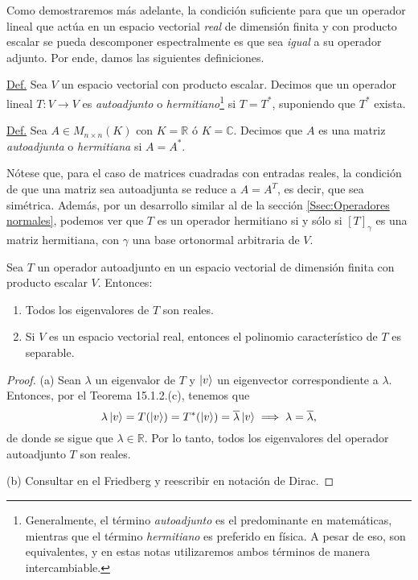 \documentclass[12pt,dvipsnames]{article}
\newenvironment{lema}[2][Lema]{\begin{trivlist}
\item[\hskip \labelsep {\bfseries #1}\hskip \labelsep {\bfseries #2.}]}{\end{trivlist}}
\begin{document}
Como demostraremos más adelante, la condición suficiente para que un operador lineal que actúa en un espacio vectorial \emph{real} de dimensión finita y con producto escalar se pueda descomponer espectralmente es que sea \emph{igual} a su operador adjunto. Por ende, damos las siguientes definiciones.

\begin{tcolorbox}
    \underline{Def.} Sea $V$ un espacio vectorial con producto escalar. Decimos que un operador lineal $T:V\to V$ es \emph{autoadjunto} o \emph{hermitiano}\footnote{Generalmente, el término \emph{autoadjunto} es el predominante en matemáticas, mientras que el término \emph{hermitiano} es preferido en física. A pesar de eso, son equivalentes, y en estas notas utilizaremos ambos términos de manera intercambiable.} si $T=T^*$, suponiendo que $T^*$ exista.

    \vspace{3mm}
    \underline{Def.} Sea $A\in M_{n\times n}(K)$ con $K=\mathbb{R}$ ó $K=\mathbb{C}$. Decimos que $A$ es una matriz \emph{autoadjunta} o \emph{hermitiana} si $A=A^*$.
\end{tcolorbox}

Nótese que, para el caso de matrices cuadradas con entradas reales, la condición de que una matriz sea autoadjunta se reduce a $A=A^T$, es decir, que sea simétrica. Además, por un desarrollo similar al de la sección \ref{Ssec:Operadores normales}, podemos ver que $T$ es un operador hermitiano si y sólo si $[T]_\gamma$ es una matriz hermitiana, con $\gamma$ una base ortonormal arbitraria de $V$.

\begin{lema} {15.2.1}
    Sea $T$ un operador autoadjunto en un espacio vectorial de dimensión finita con producto escalar $V$. Entonces:
    \begin{enumerate}[label=(\alph*)]
        \item Todos los eigenvalores de $T$ son reales.
        \item Si $V$ es un espacio vectorial real, entonces el polinomio característico de $T$ es separable.
    \end{enumerate}

    \begin{proof}
        (a) Sean $\lambda$ un eigenvalor de $T$ y $\ket{v}$ un eigenvector correspondiente a $\lambda$. Entonces, por el Teorema 15.1.2.(c), tenemos que \[
            \lambda \ket{v} = T(\ket{v}) = T^*(\ket{v}) = \overline{\lambda} \ket{v} \implies \lambda = \overline{\lambda},
        \] de donde se sigue que $\lambda\in\mathbb{R}$. Por lo tanto, todos los eigenvalores del operador autoadjunto $T$ son reales.

        \vspace{3mm}
        (b) Consultar en el Friedberg y reescribir en notación de Dirac.
    \end{proof}
\end{lema}
\end{document}
